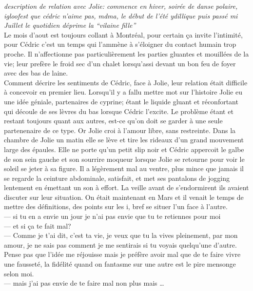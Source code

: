 \documentclass{article}
\begin{document}
\textit{description de relation avec Jolie:
  commence en hiver, soirée de danse polaire, igloofest que cédric n'aime pas,
  mdma, le début de l'été ydillique puis passé mi Juillet le quotidien déprime
  la ``vilaine fille''}\\

Le mois d'aout est toujours collant à Montréal, pour certain ça invite
l'intimité, pour Cédric c'est un temps qui l'ammène à s'éloigner du contact
humain trop proche. Il n'affectionne pas particulièrement les parties gluantes
et mouillées de la vie; leur prefère le froid sec d'un chalet lorsqu'assi devant
un bon feu de foyer avec des bas de laine.\\

Comment décrire les sentiments de Cédric, face à Jolie, leur relation était
difficile à concevoir en premier lieu. Lorsqu'il y a fallu mettre mot sur
l'histoire Jolie eu une idée géniale, partenaires de cyprine; étant le liquide
gluant et réconfortant qui découle de ses lèvres du bas lorsque Cédric l'excite.
Le problème étant et restant toujours quant aux autres, est-ce qu'on doit se
garder à une seule partenenaire de ce type. Or Jolie croi à l'amour libre, sans
restreinte. Dans la chambre de Jolie un matin elle se lève et tire les rideaux
d'un grand mouvement large des épaules. Elle ne porte qu'un petit slip noir
et Cédric appercoit le galbe de son sein gauche et son sourrire moqueur lorsque
Jolie se retourne pour voir le soleil se jeter à sa figure. Il a légèrement mal au ventre,
plus mince que jamais il se regarde la ceinture abdominale, satisfait, et met ses
pantalons de jogging lentement en émettant un son à effort. La veille avant de
s'endormirent ils avaient discuter sur leur situation. On était maintenant en Mars
et il venait le temps de mettre des définitions, des points sur les i, bref se situer
l'un face à l'autre.\\

--- si tu en a envie un jour je n'ai pas envie que tu te retiennes pour moi\\
--- et si ça te fait mal?\\
--- Comme je t'ai dit, c'est ta vie, je veux que tu la vives pleinement, par mon amour,
je ne sais pas comment je me sentirais si tu voyais quelqu'une d'autre. Pense pas que l'idée
me réjouisse mais je préfère avoir mal que de te faire vivre une fausseté, la fidélité quand on
fantasme sur une autre est le pire mensonge selon moi.\\
--- mais j'ai pas envie de te faire mal non plus mais \ldots \\
\end{document}
